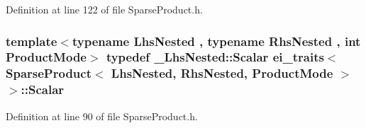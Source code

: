 Definition at line 122 of file Sparse\-Product.\-h.

\hypertarget{structei__traits_3_01_sparse_product_3_01_lhs_nested_00_01_rhs_nested_00_01_product_mode_01_4_01_4_ac8f0d0cafd9a298c2f00261779f2aa15}{
\subsubsection[{Scalar}]{\setlength{\rightskip}{0pt plus 5cm}template$<$typename Lhs\-Nested , typename Rhs\-Nested , int Product\-Mode$>$ typedef \-\_\-\-Lhs\-Nested\-::\-Scalar {\bf ei\-\_\-traits}$<$ {\bf Sparse\-Product}$<$ Lhs\-Nested, Rhs\-Nested, Product\-Mode $>$ $>$\-::{\bf Scalar}}}\label{structei__traits_3_01_sparse_product_3_01_lhs_nested_00_01_rhs_nested_00_01_product_mode_01_4_01_4_ac8f0d0cafd9a298c2f00261779f2aa15}


Definition at line 90 of file Sparse\-Product.\-h.



